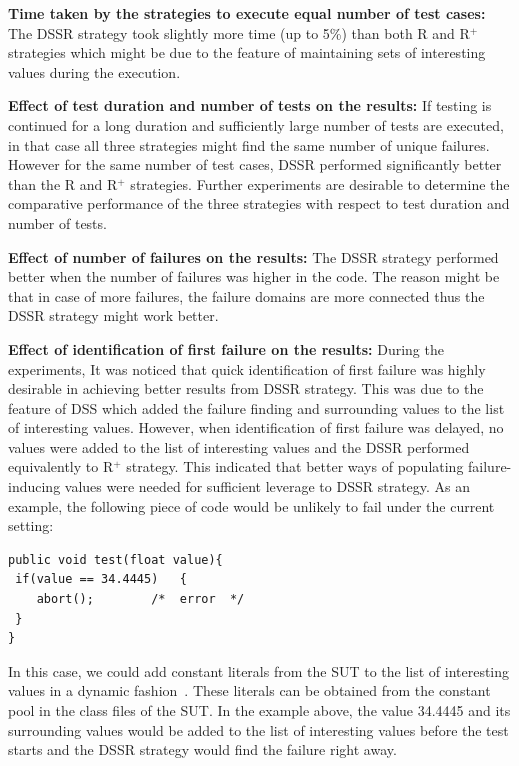 \textbf{Time taken by the strategies to execute equal number of test cases:}
The DSSR strategy took slightly more time (up to 5\%) than both R and R$^+$ strategies which might be due to the feature of maintaining sets of interesting values during the execution. 

\textbf{Effect of test duration and number of tests on the results:}
If testing is continued for a long duration and sufficiently large number of tests are executed, in that case all three strategies might find the same number of unique failures. However for the same number of test cases, DSSR performed significantly better than the R and R$^+$ strategies. Further experiments are desirable to determine the comparative performance of the three strategies with respect to test duration and number of tests.

\textbf{Effect of number of failures on the results:} 
The DSSR strategy performed better when the number of failures was higher in the code. The reason might be that in case of more failures, the failure domains are more connected thus the DSSR strategy might work better.

\textbf{Effect of identification of first failure on the results:}
During the experiments, It was noticed that quick identification of first failure was highly desirable in achieving better results from DSSR strategy. This was due to the feature of DSS which added the failure finding and surrounding values to the list of interesting values. However, when identification of first failure was delayed, no values were added to the list of interesting values and the DSSR performed equivalently to R$^+$ strategy. This indicated that better ways of populating failure-inducing values were needed for sufficient leverage to DSSR strategy. As an example, the following piece of code would be unlikely to fail under the current setting:

\begin{lstlisting}
public void test(float value){
 if(value == 34.4445)   {
 	abort(); 		/*  error  */
 }
}
\end{lstlisting}

In this case, we could add constant literals from the SUT to the list of interesting values in a dynamic fashion~\cite{godefroid2005dart}. These literals can be obtained from the constant pool in the class files of the SUT. In the example above, the value 34.4445 and its surrounding values would  be added to the list of interesting values before the test starts and the DSSR strategy would find the failure right away.

